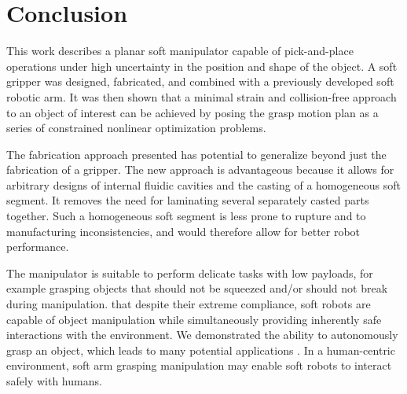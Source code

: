 \section{Conclusion}
\label{sec:conclusion}
This work describes a planar soft manipulator capable of pick-and-place operations under high uncertainty in the position and shape of the object. 
A soft gripper was designed, fabricated, and combined with a previously developed soft robotic arm.
It was then shown that a minimal strain and collision-free approach to an object of interest can be achieved by posing the grasp motion plan as a series of constrained nonlinear optimization problems.

The fabrication approach presented has potential to generalize beyond just the fabrication of a gripper.
The new approach is advantageous because it allows for arbitrary designs of internal fluidic cavities and the casting of a homogeneous soft segment. It removes the need for laminating several separately casted parts together.
Such a homogeneous soft segment is less prone to rupture and to manufacturing inconsistencies, and would therefore allow for better robot performance.

The manipulator is suitable to perform delicate tasks with low payloads, for example grasping objects that should not be squeezed and/or should not break during manipulation.
 that despite their extreme compliance, soft robots are capable of  object manipulation while simultaneously providing inherently safe interactions with the environment.
We  demonstrated the  ability to autonomously grasp an object, which leads to many potential applications .
In a human-centric environment, soft arm grasping manipulation may enable soft robots to interact safely with humans.

